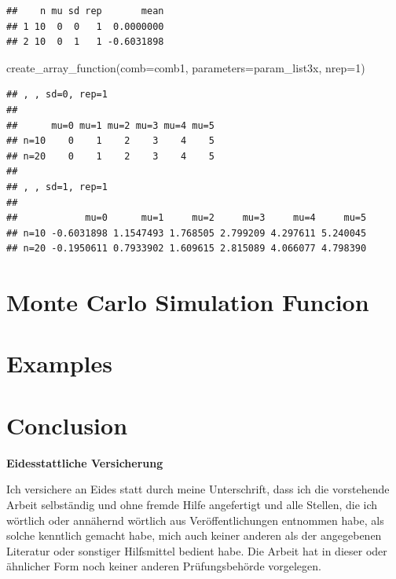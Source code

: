 \documentclass[11pt,a4paper]{article}
\newenvironment{Shaded}{\begin{snugshade}}{\end{snugshade}}
\newcommand{\AttributeTok}[1]{\textcolor[rgb]{0.77,0.63,0.00}{#1}}
\newcommand{\DecValTok}[1]{\textcolor[rgb]{0.00,0.00,0.81}{#1}}
\newcommand{\FunctionTok}[1]{\textcolor[rgb]{0.00,0.00,0.00}{#1}}
\newcommand{\NormalTok}[1]{#1}
\begin{document}
\begin{verbatim}
##    n mu sd rep       mean
## 1 10  0  0   1  0.0000000
## 2 10  0  1   1 -0.6031898
\end{verbatim}

\begin{Shaded}
\begin{Highlighting}[]
\FunctionTok{create\_array\_function}\NormalTok{(}\AttributeTok{comb=}\NormalTok{comb1, }\AttributeTok{parameters=}\NormalTok{param\_list3x, }\AttributeTok{nrep=}\DecValTok{1}\NormalTok{)}
\end{Highlighting}
\end{Shaded}

\begin{verbatim}
## , , sd=0, rep=1
## 
##      mu=0 mu=1 mu=2 mu=3 mu=4 mu=5
## n=10    0    1    2    3    4    5
## n=20    0    1    2    3    4    5
## 
## , , sd=1, rep=1
## 
##            mu=0      mu=1     mu=2     mu=3     mu=4     mu=5
## n=10 -0.6031898 1.1547493 1.768505 2.799209 4.297611 5.240045
## n=20 -0.1950611 0.7933902 1.609615 2.815089 4.066077 4.798390
\end{verbatim}

\hypertarget{monte-carlo-simulation-funcion}{%
\section{Monte Carlo Simulation
Funcion}\label{monte-carlo-simulation-funcion}}

\hypertarget{examples}{%
\section{Examples}\label{examples}}

\hypertarget{conclusion}{%
\section{Conclusion}\label{conclusion}}

\pagebreak
\renewcommand*{\mkbibnamefamily}[1]{\textbf{#1}}
\renewcommand*{\mkbibnamegiven}[1]{\textbf{#1}}
\renewcommand*{\mkbibnameprefix}[1]{\textbf{#1}}
\renewcommand*{\mkbibnamesuffix}[1]{\textbf{#1}}
\printbibliography[title=References]

\newpage
\textbf{Eidesstattliche Versicherung}

\bigskip

Ich versichere an Eides statt durch meine Unterschrift, dass ich die vorstehende Arbeit selbständig und ohne fremde Hilfe angefertigt und alle Stellen, die ich wörtlich oder annähernd wörtlich aus Veröffentlichungen entnommen habe, als solche kenntlich gemacht habe, mich auch keiner anderen als der angegebenen Literatur oder sonstiger Hilfsmittel bedient habe. Die Arbeit hat in dieser oder ähnlicher Form noch keiner anderen Prüfungsbehörde vorgelegen.

\vspace{1cm}
\rule{0pt}{2\baselineskip} %
\par\noindent{} \hfill\makebox[2.25in]{\hrulefill}%
\par\noindent\makebox[2.25in][l]{} \hfill{}%
\end{document}
